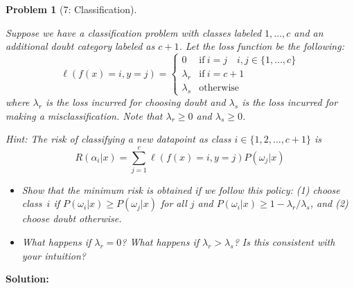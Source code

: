 \documentclass[11pt]{exam}
\theoremstyle{quest}
\newtheorem*{question}{Problem}
\begin{document}



\newpage


\begin{question}[7: Classification]
~

Suppose we have a classification problem with classes labeled $1, \dotsc, c$ and
an additional doubt category labeled as $c+1$. Let the loss function be the
following:\\
\[
\ell(f(x) = i, y = j) =
  \begin{cases}
   0 &  \mathrm{if}\ i=j \quad i,j\in\{1,\dotsc,c\} \\
   \lambda_r       & \mathrm{if}\ i=c+1 \\
   \lambda_s       & \text{otherwise}
  \end{cases}
\]
where $\lambda_r$ is the loss incurred for choosing doubt and $\lambda_s$ is the
loss incurred for making a misclassification. Note that $\lambda_r \ge 0$ and
$\lambda_s \ge 0$.

Hint: The risk of classifying a new datapoint as class $i\in\{1,2,\dots,c+1\}$
is $$R(\alpha_i|x) = \sum_{j=1}^{c} \ell(f(x) = i, y = j) P(\omega_j|x)$$

\begin{itemize}
\item[(a)] Show that the minimum risk is obtained if we follow this policy: (1)
  choose class~$i$ if $P(\omega_i|x) \geq P(\omega_j|x)$ for all $j$ and
  $P(\omega_i|x) \geq 1-\lambda_r/\lambda_s$, and (2) choose doubt otherwise.
\item[(b)] What happens if $\lambda_r=0$? What happens if $\lambda_r>\lambda_s$? Is this consistent with your intuition?
\end{itemize}
\end{question}
\textbf{Solution:}



\end{document}
